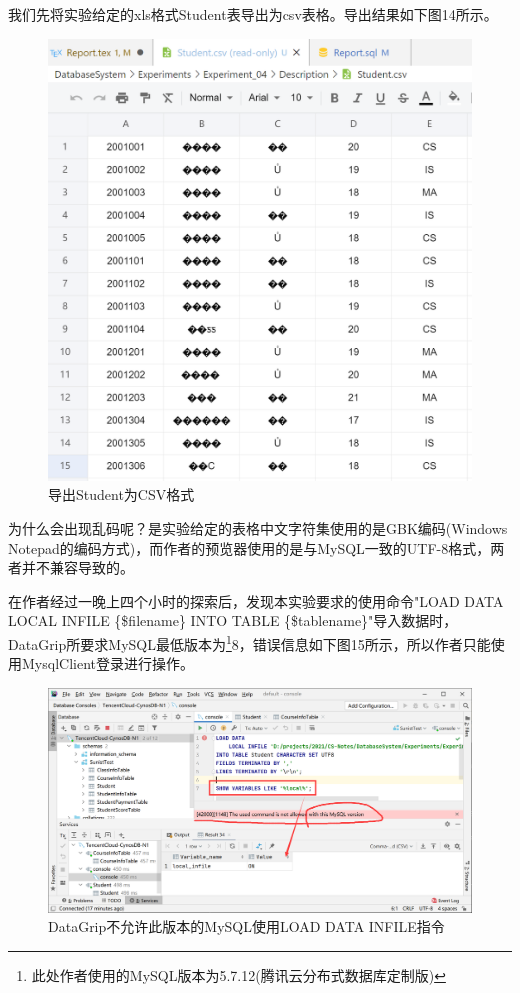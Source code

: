 \documentclass[a4paper,UTF8,heading=false,12pt]{article}
\begin{document}
\newpage

我们先将实验给定的xls格式Student表导出为csv表格。导出结果如下图14所示。

\begin{figure}[htbp]
    \centering
    \includegraphics[width=15cm]{../Images/ImportWithCommand_OnImport.png}
    \caption{导出Student为CSV格式}
\end{figure}

为什么会出现乱码呢？是实验给定的表格中文字符集使用的是GBK编码(Windows Notepad的编码方式)，而作者的预览器使用的是与MySQL一致的UTF-8格式，两者并不兼容导致的。

在作者经过一晚上四个小时的探索后，发现本实验要求的使用命令"LOAD DATA LOCAL INFILE \{\$filename\} INTO TABLE \{\$tablename\}"导入数据时，DataGrip所要求MySQL最低版本为\footnote{此处作者使用的MySQL版本为5.7.12(腾讯云分布式数据库定制版)}8，错误信息如下图15所示，所以作者只能使用MysqlClient登录进行操作。

\begin{figure}[htbp]
    \centering
    \includegraphics[width=12cm]{../Images/ImportWithCommand_ErrorOnDataGrip.png}
    \caption{DataGrip不允许此版本的MySQL使用LOAD DATA INFILE指令}
\end{figure}
\end{document}
